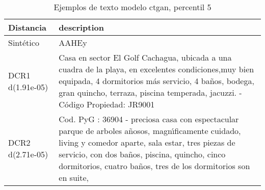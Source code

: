 \begin{table}[H]
\centering
\fontsize{10}{14}\selectfont
\caption{Ejemplos de texto modelo ctgan, percentil 5}
\label{table-example-economicos-a-1-ctgan-5p-text}
\begin{tabular}{|l|m{35em}|}
\hline
\rowcolor[gray]{0.8}
Distancia & description \\
\hline Sintético & AAHEy \\
\hline DCR1 d(1.91e-05) & Casa en sector El Golf Cachagua, ubicada a una cuadra de la playa, en excelentes condiciones,muy bien equipada, 4 dormitorios m\'as servicio, 4 ba\~nos, bodega, gran quincho, terraza, piscina temperada, jacuzzi. - C\'odigo Propiedad: JR9001 \\
\hline DCR2 d(2.71e-05) & Cod. PyG : 36904 - preciosa casa con espectacular parque de arboles a\~nosos, magn{\'\i}ficamente cuidado, living y comedor aparte, sala estar, tres piezas de servicio, con dos ba\~nos, piscina, quincho, cinco dormitorios, cuatro ba\~nos, tres de los dormitorios son en suite, \\
\hline
\end{tabular}
\end{table}
